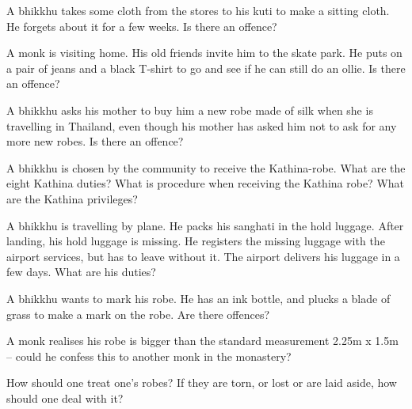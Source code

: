 \bigskip

A bhikkhu takes some cloth from the stores to his kuti to make a sitting cloth. He
forgets about it for a few weeks. Is there an offence?

\bigskip

A monk is visiting home. His old friends invite him to the skate park. He puts
on a pair of jeans and a black T-shirt to go and see if he can still do an
ollie. Is there an offence?

\bigskip

A bhikkhu asks his mother to buy him a new robe made of silk when she is travelling in Thailand,
even though his mother has asked him not to ask for any more new robes. Is there an offence?

\bigskip

A bhikkhu is chosen by the community to receive the Kathina-robe. What are the
eight Kathina duties? What is procedure when receiving the Kathina robe? What
are the Kathina privileges?

\bigskip

A bhikkhu is travelling by plane. He packs his sanghati in the hold luggage. After
landing, his hold luggage is missing. He registers the missing luggage with the
airport services, but has to leave without it. The airport delivers his luggage
in a few days. What are his duties?

\bigskip

A bhikkhu wants to mark his robe. He has an ink bottle, and plucks a blade of
grass to make a mark on the robe. Are there offences?

\bigskip

A monk realises his robe is bigger than the standard measurement 2.25m x 1.5m –
could he confess this to another monk in the monastery?

\bigskip

How should one treat one's robes? If they are torn, or lost or are laid aside, how should one deal with it?

